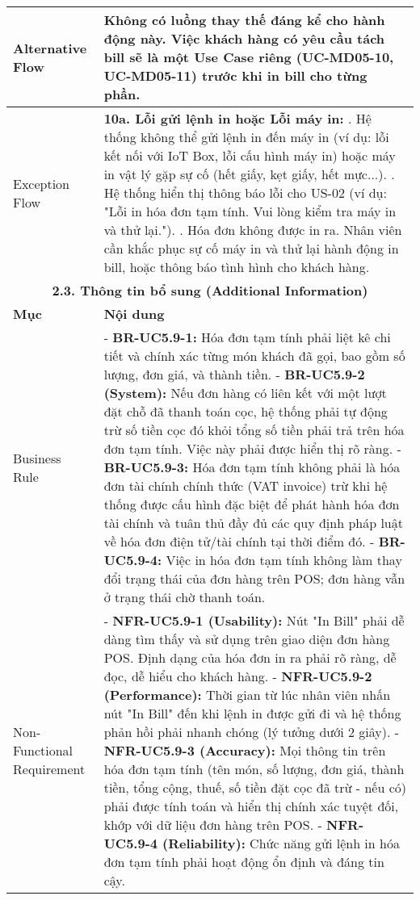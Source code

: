 \begin{longtable}{|m{4cm}|p{11cm}|}
\hline
Alternative Flow & Không có luồng thay thế đáng kể cho hành động này. Việc khách hàng có yêu cầu tách bill sẽ là một Use Case riêng (UC-MD05-10, UC-MD05-11) trước khi in bill cho từng phần. \\
\hline
Exception Flow & \textbf{10a. Lỗi gửi lệnh in hoặc Lỗi máy in:} \newline    1. Hệ thống không thể gửi lệnh in đến máy in (ví dụ: lỗi kết nối với IoT Box, lỗi cấu hình máy in) hoặc máy in vật lý gặp sự cố (hết giấy, kẹt giấy, hết mực...). \newline    2. Hệ thống hiển thị thông báo lỗi cho US-02 (ví dụ: "Lỗi in hóa đơn tạm tính. Vui lòng kiểm tra máy in và thử lại."). \newline    3. Hóa đơn không được in ra. Nhân viên cần khắc phục sự cố máy in và thử lại hành động in bill, hoặc thông báo tình hình cho khách hàng. \\
\hline
\multicolumn{2}{|c|}{\textbf{2.3. Thông tin bổ sung (Additional Information)}} \\
\hline
\textbf{Mục} & \textbf{Nội dung} \\
\hline
Business Rule & - \textbf{BR-UC5.9-1:} Hóa đơn tạm tính phải liệt kê chi tiết và chính xác từng món khách đã gọi, bao gồm số lượng, đơn giá, và thành tiền. \newline - \textbf{BR-UC5.9-2 (System):} Nếu đơn hàng có liên kết với một lượt đặt chỗ đã thanh toán cọc, hệ thống phải tự động trừ số tiền cọc đó khỏi tổng số tiền phải trả trên hóa đơn tạm tính. Việc này phải được hiển thị rõ ràng. \newline - \textbf{BR-UC5.9-3:} Hóa đơn tạm tính không phải là hóa đơn tài chính chính thức (VAT invoice) trừ khi hệ thống được cấu hình đặc biệt để phát hành hóa đơn tài chính và tuân thủ đầy đủ các quy định pháp luật về hóa đơn điện tử/tài chính tại thời điểm đó. \newline - \textbf{BR-UC5.9-4:} Việc in hóa đơn tạm tính không làm thay đổi trạng thái của đơn hàng trên POS; đơn hàng vẫn ở trạng thái chờ thanh toán. \\
\hline
Non-Functional Requirement & - \textbf{NFR-UC5.9-1 (Usability):} Nút "In Bill" phải dễ dàng tìm thấy và sử dụng trên giao diện đơn hàng POS. Định dạng của hóa đơn in ra phải rõ ràng, dễ đọc, dễ hiểu cho khách hàng. \newline - \textbf{NFR-UC5.9-2 (Performance):} Thời gian từ lúc nhân viên nhấn nút "In Bill" đến khi lệnh in được gửi đi và hệ thống phản hồi phải nhanh chóng (lý tưởng dưới 2 giây). \newline - \textbf{NFR-UC5.9-3 (Accuracy):} Mọi thông tin trên hóa đơn tạm tính (tên món, số lượng, đơn giá, thành tiền, tổng cộng, thuế, số tiền đặt cọc đã trừ - nếu có) phải được tính toán và hiển thị chính xác tuyệt đối, khớp với dữ liệu đơn hàng trên POS. \newline - \textbf{NFR-UC5.9-4 (Reliability):} Chức năng gửi lệnh in hóa đơn tạm tính phải hoạt động ổn định và đáng tin cậy. \\
\hline
\end{longtable}

